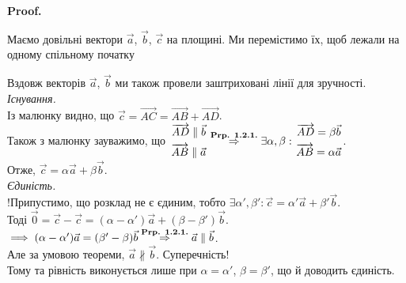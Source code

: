 \documentclass[a4paper, 10pt]{extarticle}
\makeatletter
\def\qed{$\blacksquare$}
\def\qed{$\blacksquare$}
\theoremstyle{theoremdd}
\theoremstyle{theoremdd}
\theoremstyle{theoremdd}
\theoremstyle{theoremdd}
\theoremstyle{theoremdd}
\theoremstyle{theoremdd}
\theoremstyle{theoremdd}
\theoremstyle{theoremdd}
\renewenvironment{proof}[1][Proof.\\]{\par
\pushQED{\hfill \qed}%
\normalfont \topsep6\p@\@plus6\p@\relax
\trivlist
\item\relax
{\bfseries
#1\@addpunct{.}}\hspace\labelsep\ignorespaces
}{%
\popQED\endtrivlist\@endpefalse
}
\makeatother
\begin{document}
\begin{proof}
	Маємо довільні вектори $\vec{a}$, $\vec{b}$, $\vec{c}$ на площині. Ми перемістимо їх, щоб лежали на одному спільному початку
\begin{figure}[H]
\centering
\end{figure}
	Вздовж векторів $\vec{a}$, $\vec{b}$ ми також провели заштриховані лінії для зручності.\\
\textit{Існування.}\\
	Із малюнку видно, що $\vec{c} = \overrightarrow{AC} = \overrightarrow{AB} + \overrightarrow{AD}$.\\
	Також з малюнку зауважимо, що $\left. \begin{gathered} \overrightarrow{AD} \parallel \vec{b} \\ \overrightarrow{AB} \parallel \vec{a} \end{gathered} \right. \overset{\textrm{\textbf{Prp. 1.2.1.}}}{\Rightarrow} \exists \alpha, \beta: \left. \begin{gathered} \overrightarrow{AD} = \beta \vec{b} \\ \overrightarrow{AB} = \alpha \vec{a} \end{gathered} \right.$.\\
	Отже, $\vec{c} = \alpha \vec{a} + \beta \vec{b}$.
\bigskip \\
\textit{Єдиність.}\\
!Припустимо, що розклад не є єдиним, тобто $\exists \alpha', \beta': \vec{c} = \alpha' \vec{a} + \beta' \vec{b}$.\\
	Тоді $\vec{0} = \vec{c} - \vec{c} = (\alpha-\alpha') \vec{a} + (\beta - \beta') \vec{b}$.\\
	$\implies (\alpha-\alpha')\vec{a} = (\beta' - \beta)\vec{b} \overset{\textrm{\textbf{Prp. 1.2.1.}}}{\Rightarrow} \vec{a} \parallel \vec{b}$.\\
	Але за умовою теореми, $\vec{a} \not\parallel \vec{b}$. Суперечність!\\ Тому та рівність виконується лише при $\alpha = \alpha'$, $\beta = \beta'$, що й доводить єдиність.
\end{proof}
\end{document}
